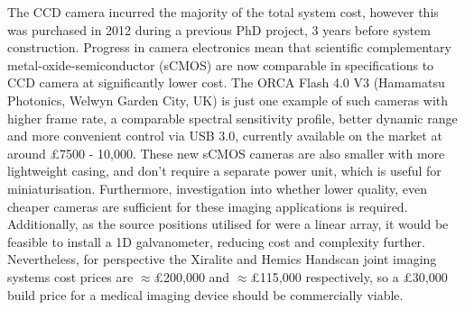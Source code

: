 \documentclass[twoside]{bhamthesis}
\theoremstyle{definition}
\begin{document}
The CCD camera incurred the majority of the total system cost, however this was purchased in 2012 during a previous PhD project, 3 years before system construction. Progress in camera electronics mean that scientific complementary metal-oxide-semiconductor (sCMOS) are now comparable in specifications to CCD camera at significantly lower cost. The ORCA Flash 4.0 V3 (Hamamatsu Photonics, Welwyn Garden City, UK) is just one example of such cameras with higher frame rate, a comparable spectral sensitivity profile, better dynamic range and more convenient control via USB 3.0, currently available on the market at around \pounds 7500 - 10,000. These new sCMOS cameras are also smaller with more lightweight casing, and don't require a separate power unit, which is useful for miniaturisation. Furthermore, investigation into whether lower quality, even cheaper cameras are sufficient for these imaging applications is required. Additionally, as the source positions utilised for were a linear array, it would be feasible to install a 1D galvanometer, reducing cost and complexity further. Nevertheless, for perspective the Xiralite and Hemics Handscan joint imaging systems cost prices are $\approx$\pounds 200,000 and $\approx$\pounds 115,000 respectively, so a \pounds 30,000 build price for a medical imaging device should be commercially viable.


\end{document}

